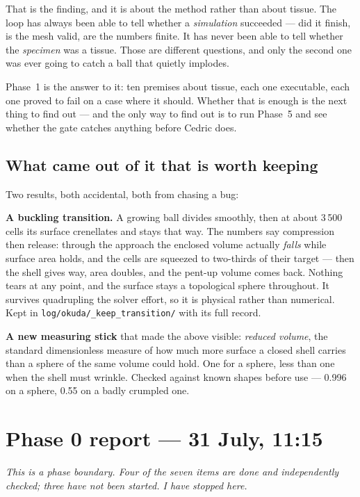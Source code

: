 \documentclass[11pt,a4paper]{article}
\begin{document}
That is the finding, and it is about the method rather than about tissue. The loop has always been
able to tell whether a \emph{simulation} succeeded --- did it finish, is the mesh valid, are the
numbers finite. It has never been able to tell whether the \emph{specimen} was a tissue. Those are
different questions, and only the second one was ever going to catch a ball that quietly implodes.

Phase~1 is the answer to it: ten premises about tissue, each one executable, each one proved to
fail on a case where it should. Whether that is enough is the next thing to find out --- and the
only way to find out is to run Phase~5 and see whether the gate catches anything before Cedric
does.

\subsection{What came out of it that is worth keeping}

Two results, both accidental, both from chasing a bug:

\textbf{A buckling transition.} A growing ball divides smoothly, then at about 3\,500 cells its
surface crenellates and stays that way. The numbers say compression then release: through the
approach the enclosed volume actually \emph{falls} while surface area holds, and the cells are
squeezed to two-thirds of their target --- then the shell gives way, area doubles, and the pent-up
volume comes back. Nothing tears at any point, and the surface stays a topological sphere
throughout. It survives quadrupling the solver effort, so it is physical rather than numerical.
Kept in \texttt{log/okuda/\_keep\_transition/} with its full record.

\textbf{A new measuring stick} that made the above visible: \emph{reduced volume}, the standard
dimensionless measure of how much more surface a closed shell carries than a sphere of the same
volume could hold. One for a sphere, less than one when the shell must wrinkle. Checked against
known shapes before use --- 0.996 on a sphere, 0.55 on a badly crumpled one.

\section{Phase 0 report --- 31 July, 11:15}\label{sec:p0report}

\emph{This is a phase boundary. Four of the seven items are done and independently checked; three
have not been started. I have stopped here.}
\end{document}
